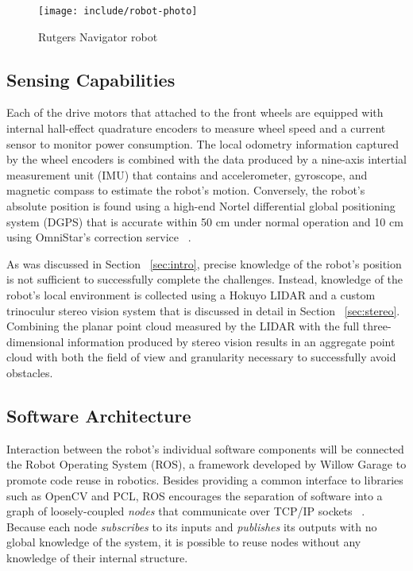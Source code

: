 \documentclass[11pt,twocolumn]{article}
\begin{document}
\begin{figure}
	\center
	\texttt{[image: include/robot-photo]}
	\caption{Rutgers Navigator robot}
	\label{fig:robot-photo}
\end{figure}

\subsection{Sensing Capabilities}
\label{sec:robot-sensors}
Each of the drive motors that attached to the front wheels are equipped with
internal hall-effect quadrature encoders to measure wheel speed and a current
sensor to monitor power consumption. The local odometry information captured by
the wheel encoders is combined with the data produced by a nine-axis intertial
measurement unit (IMU) that contains and accelerometer, gyroscope, and magnetic
compass to estimate the robot's motion. Conversely, the robot's absolute
position is found using a high-end Nortel differential global positioning
system (DGPS) that is accurate within 50 cm under normal operation and 10 cm
using OmniStar's correction service ~\cite{omnistar}.

As was discussed in Section ~\ref{sec:intro}, precise knowledge of the robot's
position is not sufficient to successfully complete the challenges. Instead,
knowledge of the robot's local environment is collected using a Hokuyo LIDAR
and a custom trinoculur stereo vision system that is discussed in detail in
Section ~\ref{sec:stereo}. Combining the planar point cloud measured by the
LIDAR with the full three-dimensional information produced by stereo vision
results in an aggregate point cloud with both the field of view and granularity
necessary to successfully avoid obstacles.

\subsection{Software Architecture}
\label{sec:robot-software}
Interaction between the robot's individual software components will be
connected the Robot Operating System (ROS), a framework developed by Willow
Garage to promote code reuse in robotics. Besides providing a common interface
to libraries such as OpenCV and PCL, ROS encourages the separation of software
into a graph of loosely-coupled \textit{nodes} that communicate over TCP/IP
sockets ~\cite{ros}. Because each node \textit{subscribes} to its inputs and
\textit{publishes} its outputs with no global knowledge of the system, it is
possible to reuse nodes without any knowledge of their internal structure.
\end{document}
